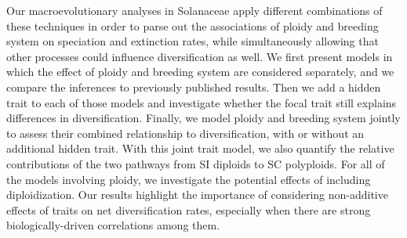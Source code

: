 Our macroevolutionary analyses in Solanaceae apply different combinations of these techniques in order to parse out the associations of ploidy and breeding system on speciation and extinction rates, while simultaneously allowing that other processes could influence diversification as well.
We first present models in which the effect of ploidy and breeding system are considered separately, and we compare the inferences to previously published results. 
Then we add a hidden trait to each of those models and investigate whether the focal trait still explains differences in diversification.
Finally, we model ploidy and breeding system jointly to assess their combined relationship to diversification, with or without an additional hidden trait.
With this joint trait model, we also quantify the relative contributions of the two pathways from SI diploids to SC polyploids.
For all of the models involving ploidy, we investigate the potential effects of including diploidization.
Our results highlight the importance of considering non-additive effects of traits on net diversification rates, especially when there are strong biologically-driven correlations among them.
